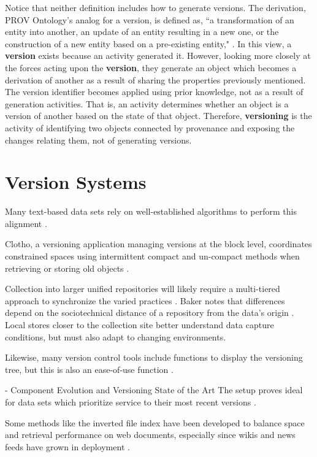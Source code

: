 Notice that neither definition includes how to generate versions.
The derivation, PROV Ontology's analog for a version, is defined as, ``a transformation of an entity into another, an update of an entity resulting in a new one, or the construction of a new entity based on a pre-existing entity," \cite{Lebo2013}.
In this view, a \textbf{version} exists because an activity generated it.
However, looking more closely at the forces acting upon the \textbf{version}, they generate an object which becomes a derivation of another as a result of sharing the properties previously mentioned.
The version identifier becomes applied using prior knowledge, not as a result of generation activities.
That is, an activity determines whether an object is a version of another based on the state of that object.
Therefore, \textbf{versioning} is the activity of identifying two objects connected by provenance and exposing the changes relating them, not of generating versions.

\section{Version Systems}

Many text-based data sets rely on well-established algorithms to perform this alignment  \cite{Chien:2000:VMX:646544.696357}.

Clotho, a versioning application managing versions at the block level, coordinates constrained spaces using intermittent compact and un-compact methods when retrieving or storing old objects \cite{Flouris04clotho:transparent}.

Collection into larger unified repositories will likely require a multi-tiered approach to synchronize the varied practices  \cite{Baker2009}.
Baker notes that differences depend on the sociotechnical distance of a repository from the data's origin \cite{Baker2009}.
Local stores closer to the collection site better understand data capture conditions, but must also adapt to changing environments.

Likewise, many version control tools include functions to display the versioning tree, but this is also an ease-of-use function \cite{Dijkstra1994}.

\cite{Stuckenholz:2005:CEV:1039174.1039197} - Component Evolution and Versioning State of the Art
The setup proves ideal for data sets which prioritize service to their most recent versions \cite{Stuckenholz:2005:CEV:1039174.1039197}.

Some methods like the inverted file index have been developed to balance space and retrieval performance on web documents, especially since wikis and news feeds have grown in deployment \cite{Berberich:2007:TMT:1277741.1277831}.

